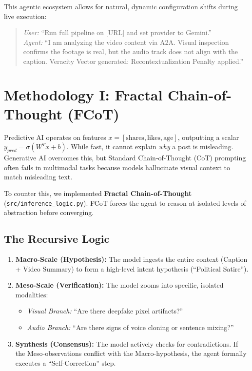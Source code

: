 \documentclass[12pt,letterpaper]{article}
\begin{document}
This agentic ecosystem allows for natural, dynamic configuration shifts during live execution:
\begin{quote}
    \textit{User:} ``Run full pipeline on [URL] and set provider to Gemini.''\\
    \textit{Agent:} ``I am analyzing the video content via A2A. Visual inspection confirms the footage is real, but the audio track does not align with the caption. Veracity Vector generated: Recontextualization Penalty applied.''
\end{quote}

\section{Methodology I: Fractal Chain-of-Thought (FCoT)}

Predictive AI operates on features $x =[\text{shares}, \text{likes}, \text{age}]$, outputting a scalar $y_{pred} = \sigma(W^T x + b)$. While fast, it cannot explain \textit{why} a post is misleading. Generative AI overcomes this, but Standard Chain-of-Thought (CoT) prompting often fails in multimodal tasks because models hallucinate visual context to match misleading text.

To counter this, we implemented \textbf{Fractal Chain-of-Thought} (\texttt{src/inference\_logic.py}). FCoT forces the agent to reason at isolated levels of abstraction before converging.

\subsection{The Recursive Logic}
\begin{enumerate}
    \item  \textbf{Macro-Scale (Hypothesis):} The model ingests the entire context (Caption + Video Summary) to form a high-level intent hypothesis (``Political Satire'').
    \item  \textbf{Meso-Scale (Verification):} The model zooms into specific, isolated modalities:
    \begin{itemize}
        \item   \textit{Visual Branch:} ``Are there deepfake pixel artifacts?''
        \item   \textit{Audio Branch:} ``Are there signs of voice cloning or sentence mixing?''
    \end{itemize}
    \item  \textbf{Synthesis (Consensus):} The model actively checks for contradictions. If the Meso-observations conflict with the Macro-hypothesis, the agent formally executes a ``Self-Correction'' step.
\end{enumerate}
\end{document}
